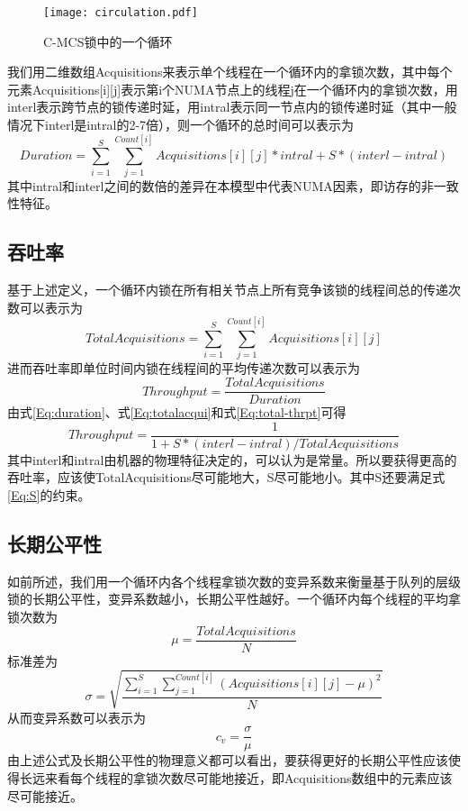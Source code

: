 \begin{figure}[t]
	\centering
	\texttt{[image: circulation.pdf]}
	\caption{C-MCS锁中的一个循环}
	\label{Fig:circulation}
\end{figure}

我们用二维数组Acquisitions来表示单个线程在一个循环内的拿锁次数，其中每个元素Acquisitions[i][j]表示第i个NUMA节点上的线程j在一个循环内的拿锁次数，用interl表示跨节点的锁传递时延，用intral表示同一节点内的锁传递时延（其中一般情况下interl是intral的2-7倍\cite{kashyap2017scalable}），则一个循环的总时间可以表示为
\begin{equation}\label{Eq:duration}
 Duration=\sum_{i=1}^{S}\sum_{j=1}^{Count[i]} Acquisitions[i][j] * intral + S * (interl - intral)
\end{equation}
其中intral和interl之间的数倍的差异在本模型中代表NUMA因素，即访存的非一致性特征。

\subsection{吞吐率}
基于上述定义，一个循环内锁在所有相关节点上所有竞争该锁的线程间总的传递次数可以表示为
\begin{equation}\label{Eq:totalacqui}
  TotalAcquisitions=\sum_{i=1}^{S}\sum_{j=1}^{Count[i]} Acquisitions[i][j]
\end{equation}
进而吞吐率即单位时间内锁在线程间的平均传递次数可以表示为
\begin{equation}\label{Eq:total-thrpt}
 Throughput=\frac{TotalAcquisitions}{Duration}
\end{equation}
由式\ref{Eq:duration}、式\ref{Eq:totalacqui}和式\ref{Eq:total-thrpt}可得
\begin{equation}\label{Eq:thrpt-new}
 Throughput=\frac{1}{1+S*(interl - intral)/TotalAcquisitions}
\end{equation}
其中interl和intral由机器的物理特征决定的，可以认为是常量。所以要获得更高的吞吐率，应该使TotalAcquisitions尽可能地大，S尽可能地小。其中S还要满足式\ref{Eq:S}的约束。

\subsection{长期公平性}
如前所述，我们用一个循环内各个线程拿锁次数的变异系数来衡量基于队列的层级锁的长期公平性，变异系数越小，长期公平性越好。一个循环内每个线程的平均拿锁次数为
\begin{equation}\label{Eq:AVG}
  \mu = \frac{TotalAcquisitions}{N}
\end{equation}
标准差为
\begin{equation}\label{Eq:SD}
  \sigma=\sqrt{\frac{\sum_{i=1}^S\sum_{j=1}^{Count[i]}(Acquisitions[i][j]-\mu)^2}{N}}
\end{equation}
从而变异系数可以表示为
\begin{equation}\label{Eq:CV}
 c_v=\frac{\sigma}{\mu}
\end{equation}
由上述公式及长期公平性的物理意义都可以看出，要获得更好的长期公平性应该使得长远来看每个线程的拿锁次数尽可能地接近，即Acquisitions数组中的元素应该尽可能接近。

